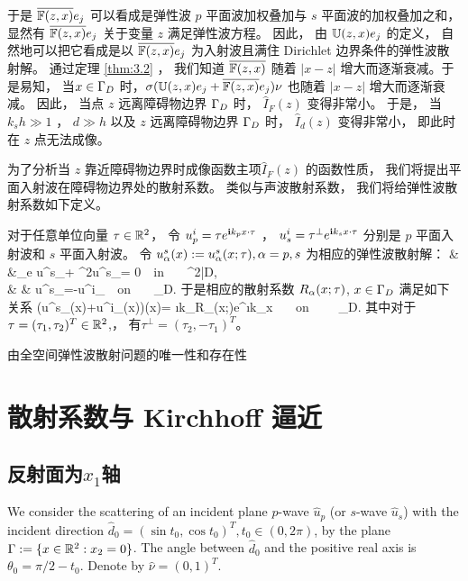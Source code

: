 {于是 $\overline{\mathbb{F}(z,x)}e_j$ 可以看成是弹性波 $p$ 平面波加权叠加与 $s$ 平面波的加权叠加之和， 显然有 $\overline{\mathbb{F}(z,x)}e_j$ 关于变量 $z$ 满足弹性波方程。 因此， 由 $\mathbb{U}(z,x)e_j$ 的定义， 自然地可以把它看成是以 $\overline{\mathbb{F}(z,x)}e_j$ 为入射波且满住 Dirichlet 边界条件的弹性波散射解。 通过定理 \ref{thm:3.2} ， 我们知道 $\overline{\mathbb{F}(z,x)}$ 随着 $|x-z|$ 增大而逐渐衰减。于是易知， 当$x\in \Gamma_D$ 时，$\sigma(\mathbb{U}(z,x)e_j+\overline{\mathbb{F}(z,x)}e_j)\nu$ 也随着 $|x-z|$ 增大而逐渐衰减。 因此， 当点 $z$ 远离障碍物边界 $\Gamma_D$ 时， $\hat{I}_F(z)$ 变得非常小。 于是， 当 $k_s h \gg 1$ ， $d\gg h$ 以及 $z$ 远离障碍物边界 $\Gamma_D$ 时， $\hat{I}_d(z)$ 变得非常小， 即此时在 $z$ 点无法成像。

为了分析当 $z$ 靠近障碍物边界时成像函数主项$\hat{I}_F(z)$ 的函数性质， 我们将提出平面入射波在障碍物边界处的散射系数。 类似与声波散射系数， 我们将给弹性波散射系数如下定义。

\begin{definition}\label{scarr_con}
	对于任意单位向量 $\tau\in \mathbb{R}^2$， 令 $u^i_p =\tau e^{\mathbf{i} k_p x\cdot \tau}$ ，  $u^i_s= \tau^\perp e^{\mathbf{i} k_s x\cdot \tau}$ 分别是 $p$ 平面入射波和 $s$ 平面入射波。   令 $u^s_\alpha (x) := u^s_\alpha(x;\tau), \alpha=p,s$ 为相应的弹性波散射解：
	\be\label{sc1}
	& &\De_e u^s_\alpha + \om^2u^s_\alpha = 0\ \ \mbox{in }   \ \ \R^2\bks\bar{D}, \ \ \ \  \\
	& & u^s_\alpha =-u^i_\alpha \ \ \mbox{on }  \ \ \Ga_D.
	\ee
	于是相应的散射系数 $R_\alpha(x;\tau)$, $x\in\Gamma_D$ 满足如下关系
	\ben
	\sigma(u^s_\alpha(x)+u^i_\alpha(x))\nu(x)= \i k_\alpha R_\alpha(x;\tau)e^{\i k_\alpha x\cdot \tau}  \ \ \ \mbox{on } \ \ \  \Ga_D.
	\een
	其中对于 $\tau=(\tau_1,\tau_2)^T\in\mathbb{R}^2$,， 有$\tau^\perp=(\tau_2,-\tau_1)^T$。
\end{definition}
\begin{remark}
	由全空间弹性波散射问题的唯一性和存在性 \cite{cxz2016,}
\end{remark}

\section{散射系数与 Kirchhoff 逼近}

\subsection{反射面为$x_1$轴}

We consider the scattering of an incident plane $p$-wave  $\hat u_p$ (or $s$-wave $\hat u_s$) with the incident direction $\hat d_0=(\sin t_0, \cos t_0)^T, t_0\in (0,2\pi)$, by the plane $\Gamma := \{x \in \mathbb{R}^2 :x _2 = 0\}$. 
The angle between $\hat d_0$ and the positive real axis is $\theta_0=\pi/2-t_0$. Denote by $\hat\nu=(0,1)^T$.


}
